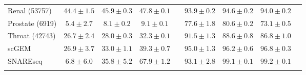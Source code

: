 \begin{table}
\begin{footnotesize}
\begin{tabular}{@{\hskip 0.1in}l@{\hskip 0.1in}c@{\hskip 0.1in}c@{\hskip 0.1in}c@{\hskip 0.1in}c@{\hskip 0.1in}c@{\hskip 0.1in}c@{\hskip 0.1in}c@{\hskip 0.1in}c@{\hskip 0.1in}}
Renal \tiny{(53757)} & $44.4\pm1.5$ & $45.9\pm0.3$ & $\mathbf{47.8\pm0.1}$ && $93.9\pm0.2$ & $\mathbf{94.6\pm0.2}$ & $94.0\pm0.2$ \\ 
Prostate \tiny{(6919)} & $5.4\pm2.7$ & $8.1\pm0.2$ & $\mathbf{9.1\pm0.1}$ && $77.6\pm1.8$ & $\mathbf{80.6\pm0.2}$ & $73.1\pm0.5$ \\ 
Throat \tiny{(42743)} & $26.7\pm2.4$ & $28.0\pm0.3$ & $\mathbf{32.3\pm0.1}$ && $\mathbf{91.5\pm1.3}$ & $88.6\pm0.8$ & $86.8\pm1.0$ \\ \midrule[0.2pt]
scGEM & $26.9\pm3.7$ & $33.0\pm1.1$ & $\mathbf{39.3\pm0.7}$ && $95.0\pm1.3$ & $96.2\pm0.6$ & $\mathbf{96.8\pm0.3}$ \\
SNAREseq & $6.8\pm6.0$ & $35.8\pm5.2$ & $\mathbf{67.9\pm1.2}$ && $93.1\pm2.8$ & $99.1\pm0.1$ & $\mathbf{99.2\pm0.1}$ \\
\bottomrule[1.5pt]
\label{tab:DR_genomics_data}
\end{tabular}
\end{footnotesize}
\vspace*{-0.5cm}
\end{table}


    